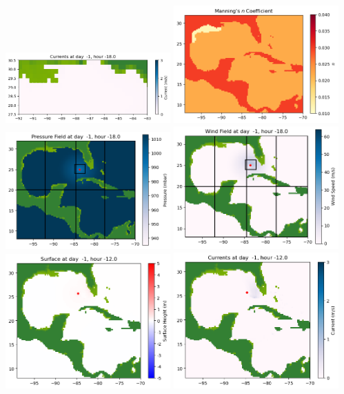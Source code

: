 \documentclass[11pt]{article}
\begin{document}
\includegraphics[width=0.475\textwidth]{frame0001fig1004.png}
\vskip 10pt 
\includegraphics[width=0.475\textwidth]{frame0001fig1005.png}
\includegraphics[width=0.475\textwidth]{frame0001fig1006.png}
\vskip 10pt 
\includegraphics[width=0.475\textwidth]{frame0001fig1007.png}
\vskip 10pt 
\includegraphics[width=0.475\textwidth]{frame0002fig1001.png}
\includegraphics[width=0.475\textwidth]{frame0002fig1002.png}
\end{document}

